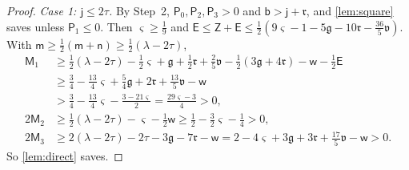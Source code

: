 \documentclass[11pt,colorlinks]{charlie}
\begin{document}
\begin{proof}
\emph{Case 1: $\mathsf j\le2\tau$.} By Step~2, $\mathsf P_0,\mathsf P_2,\mathsf P_3>0$ and $\mathsf b>\mathsf j+\mathfrak r$, and \cref{lem:square} saves unless $\mathsf P_1\le0$. Then $\varsigma\ge\frac19$ and $\mathsf E\le\mathsf Z+\mathsf E\le\frac12(9\varsigma-1-5\mathfrak g-10\mathfrak r-\frac{36}5\mathfrak v)$. With $\mathsf m\ge\frac12(\mathsf m+\mathsf n)\ge\frac12(\lambda-2\tau)$,
\[
 \begin{aligned}
 \mathsf M_1&\ge\tfrac12(\lambda-2\tau)-\tfrac12\varsigma+\mathfrak g+\tfrac12\mathfrak r+\tfrac25\mathfrak v-\tfrac12(3\mathfrak g+4\mathfrak r)-\mathsf w-\tfrac12\mathsf E\\
 &\ge\tfrac34-\tfrac{13}4\varsigma+\tfrac54\mathfrak g+2\mathfrak r+\tfrac{13}5\mathfrak v-\mathsf w\\
 &>\tfrac34-\tfrac{13}4\varsigma-\tfrac{3-21\varsigma}2=\tfrac{29\varsigma-3}4>0,\\
 2\mathsf M_2&\ge\tfrac12(\lambda-2\tau)-\varsigma-\tfrac12\mathsf w\ge\tfrac12-\tfrac32\varsigma-\tfrac14>0,\\
 2\mathsf M_3&\ge2(\lambda-2\tau)-2\tau-3\mathfrak g-7\mathfrak r-\mathsf w=2-4\varsigma+3\mathfrak g+3\mathfrak r+\tfrac{17}5\mathfrak v-\mathsf w>0 .
 \end{aligned}
\]
So \cref{lem:direct} saves.


\end{proof}
\end{document}
